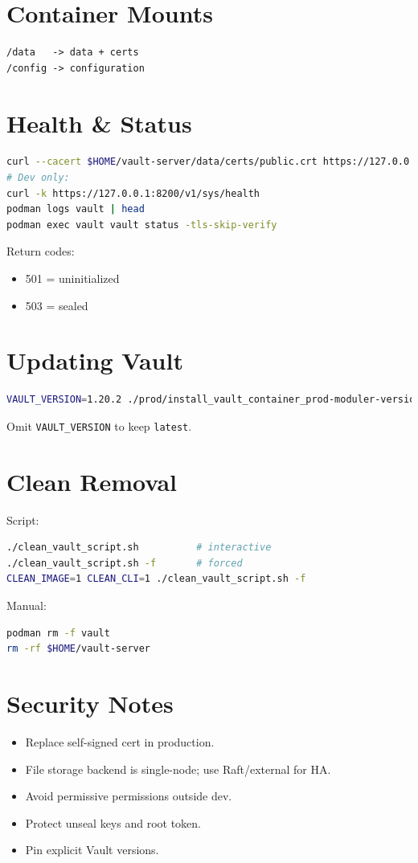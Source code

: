 \documentclass[12pt]{article}
\begin{document}
\section{Container Mounts}
\begin{verbatim}
/data   -> data + certs
/config -> configuration
\end{verbatim}

\section{Health \& Status}
\begin{lstlisting}[language=bash]
curl --cacert $HOME/vault-server/data/certs/public.crt https://127.0.0.1:8200/v1/sys/health
# Dev only:
curl -k https://127.0.0.1:8200/v1/sys/health
podman logs vault | head
podman exec vault vault status -tls-skip-verify
\end{lstlisting}
Return codes:
\begin{itemize}
  \item 501 = uninitialized
  \item 503 = sealed
\end{itemize}

\section{Updating Vault}
\begin{lstlisting}[language=bash]
VAULT_VERSION=1.20.2 ./prod/install_vault_container_prod-moduler-version-clean-working.sh
\end{lstlisting}
Omit \texttt{VAULT\_VERSION} to keep \texttt{latest}.

\section{Clean Removal}
Script:
\begin{lstlisting}[language=bash]
./clean_vault_script.sh          # interactive
./clean_vault_script.sh -f       # forced
CLEAN_IMAGE=1 CLEAN_CLI=1 ./clean_vault_script.sh -f
\end{lstlisting}
Manual:
\begin{lstlisting}[language=bash]
podman rm -f vault
rm -rf $HOME/vault-server
\end{lstlisting}

\section{Security Notes}
\begin{itemize}
  \item Replace self-signed cert in production.
  \item File storage backend is single-node; use Raft/external for HA.
  \item Avoid permissive permissions outside dev.
  \item Protect unseal keys and root token.
  \item Pin explicit Vault versions.
\end{itemize}
\end{document}
